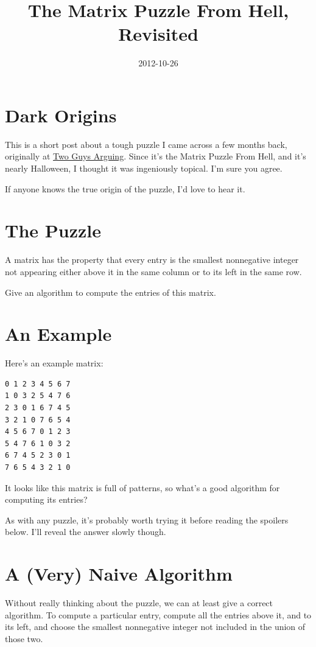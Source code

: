 \documentclass[11pt]{article}
\title{The Matrix Puzzle From Hell, Revisited}
\date{2012-10-26}
\begin{document}
\section{Dark Origins}

This is a short post about a tough puzzle I came across a few months back, originally at \href{http://twoguysarguing.wordpress.com/2010/12/30/matrix-puzzle-from-hell-or-how-i-learned-to-stop-worrying-and-love-the-patterns/}{Two Guys Arguing}. Since it's the Matrix Puzzle From Hell, and it's nearly Halloween, I thought it was ingeniously topical. I'm sure you agree.

If anyone knows the true origin of the puzzle, I'd love to hear it.

\section{The Puzzle}

A matrix has the property that every entry is the smallest nonnegative integer not appearing either above it in the same column or to its left in the same row.

Give an algorithm to compute the entries of this matrix.

\section{An Example}

Here's an example matrix:

\begin{verbatim}
0 1 2 3 4 5 6 7
1 0 3 2 5 4 7 6
2 3 0 1 6 7 4 5
3 2 1 0 7 6 5 4
4 5 6 7 0 1 2 3
5 4 7 6 1 0 3 2
6 7 4 5 2 3 0 1
7 6 5 4 3 2 1 0
\end{verbatim}

It looks like this matrix is full of patterns, so what's a good algorithm for computing its entries?

As with any puzzle, it's probably worth trying it before reading the spoilers below. I'll reveal the answer slowly though.

\section{A (Very) Naive Algorithm}

Without really thinking about the puzzle, we can at least give a correct algorithm. To compute a particular entry, compute all the entries above it, and to its left, and choose the smallest nonnegative integer not included in the union of those two.
\end{document}
